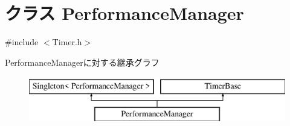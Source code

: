 \hypertarget{class_performance_manager}{\section{クラス Performance\-Manager}
\label{class_performance_manager}
}


{\ttfamily \#include $<$Timer.\-h$>$}

Performance\-Managerに対する継承グラフ\begin{figure}[H]
\begin{center}
\leavevmode
\includegraphics[height=2.000000cm]{da/d4f/class_performance_manager}
\end{center}
\end{figure}
